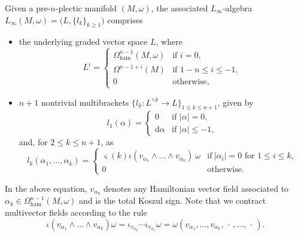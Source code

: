 \documentclass[10pt,a4paper]{amsart}
\numberwithin{equation}{section}
\newcommand{\ham}{\text{ham}}
\renewcommand{\d}{\mathrm{d}}
\begin{document}
\begin{Definition}\label{def:RogersAlgebra}
	Given a pre-$n$-plectic manifold $(M,\omega)$, the associated $L_\infty$-algebra $L_{\infty}(M,\omega)=\bigl(L,\{l_k\}_{k\geq 1}\bigr)$ comprises
	\begin{itemize}\itemsep=0pt
		\item
		the underlying graded vector space $L$, where
	\begin{equation*}
		L^i=\begin{cases}
			\Omega_{\ham}^{n-1}(M,\omega)
			& \text{if } i=0,
			\\
			\Omega^{n-1+i}(M)
		 	&  \text{if } 1-n \leq i\leq -1,
		 	\\			
			0 & \text{otherwise,}
		\end{cases}
	\end{equation*}

	\item
		$n+1$ nontrivial multibrackets $\bigl\lbrace l_k \colon L^{\wedge k} \to L\bigr\rbrace_{1\leq k\leq n+1}$, given by
	\begin{displaymath}
		l_1(\alpha) =
		\begin{cases}
			0 & \text{if~} |\alpha| = 0	,
			\\
			\d \alpha &  \text{if~} |\alpha| \leq -1,
		\end{cases}
	\end{displaymath}
	and, for $ 2 \leq k \leq n+1$, as
	\begin{displaymath}
		l_k(\alpha_1,\dots,\alpha_k) =
		\begin{cases}
			\varsigma(k) \iota( v_{\alpha_1}\wedge\dots\wedge v_{\alpha_k})~\omega
			&\text{if} \ |\alpha_i|=0 \text{ for } 1\leq i \leq k,
			\\
			0 & \text{otherwise.}		
		\end{cases}
	\end{displaymath}
	\end{itemize}
In the above equation, $ v_{\alpha_k}$ denotes any Hamiltonian vector field associated to $\alpha_k\in \Omega^{n-1}_{\ham}(M,\omega)$ and  is the total Koszul sign. Note that we contract multivector fields according to the rule
	 \[
		 \iota( v_{\alpha_1}\wedge\dots\wedge v_{\alpha_k}) \omega=\iota_{ v_{\alpha_k}}\cdots\iota_{ v_{\alpha_1}}\omega=\omega( v_{\alpha_1},\dots, v_{\alpha_k}, \,\cdot\,, \dots,\,\cdot\,).
	 \]
\end{Definition}
\end{document}
